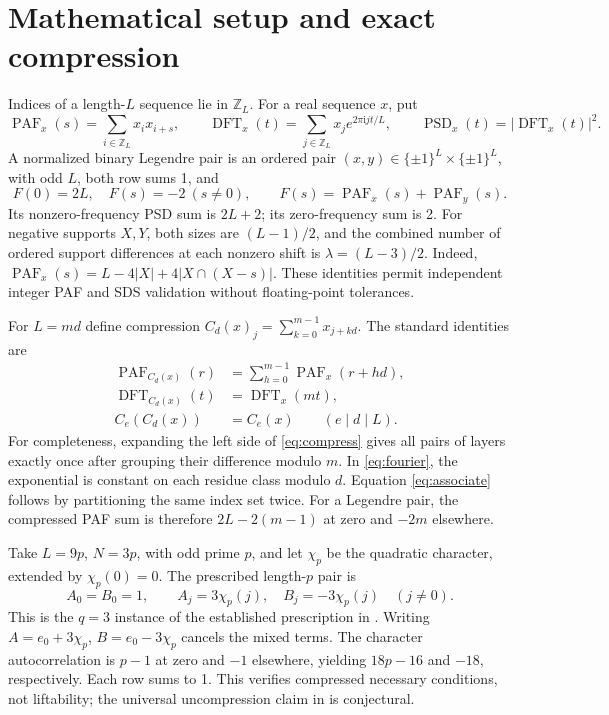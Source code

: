 \documentclass[11pt]{article}
\newcommand{\PAF}{\operatorname{PAF}}
\newcommand{\DFT}{\operatorname{DFT}}
\newcommand{\PSD}{\operatorname{PSD}}
\newcommand{\Z}{\mathbb Z}
\begin{document}
\section{Mathematical setup and exact compression}
Indices of a length-$L$ sequence lie in $\Z_L$. For a real sequence $x$, put
\[
 \PAF_x(s)=\sum_{i\in\Z_L}x_i x_{i+s},\qquad
 \DFT_x(t)=\sum_{j\in\Z_L}x_j e^{2\pi\mathrm{i}jt/L},\qquad
 \PSD_x(t)=|\DFT_x(t)|^2.
\]
A normalized binary Legendre pair is an ordered pair
$(x,y)\in\{\pm1\}^L\times\{\pm1\}^L$, with odd $L$, both row sums 1,
and
\begin{equation}\label{eq:lp}
 F(0)=2L,\quad F(s)=-2\ (s\ne0),\qquad
 F(s)=\PAF_x(s)+\PAF_y(s).
\end{equation}
Its nonzero-frequency PSD sum is $2L+2$; its zero-frequency sum is 2.
For negative supports $X,Y$, both sizes are $(L-1)/2$, and the combined
number of ordered support differences at each nonzero shift is
$\lambda=(L-3)/2$. Indeed,
$\PAF_x(s)=L-4|X|+4|X\cap(X-s)|$. These identities permit independent
integer PAF and SDS validation without floating-point tolerances.

For $L=md$ define compression $C_d(x)_j=\sum_{k=0}^{m-1}x_{j+kd}$.
The standard identities \cite{compression} are
\begin{align}
 \PAF_{C_d(x)}(r)&=\sum_{h=0}^{m-1}\PAF_x(r+hd),\label{eq:compress}\\
 \DFT_{C_d(x)}(t)&=\DFT_x(mt),\label{eq:fourier}\\
 C_e(C_d(x))&=C_e(x)\qquad(e\mid d\mid L).\label{eq:associate}
\end{align}
For completeness, expanding the left side of \eqref{eq:compress} gives
all pairs of layers exactly once after grouping their difference modulo $m$.
In \eqref{eq:fourier}, the exponential is constant on each residue class
modulo $d$. Equation \eqref{eq:associate} follows by partitioning the same
index set twice. For a Legendre pair, the compressed PAF sum is therefore
$2L-2(m-1)$ at zero and $-2m$ elsewhere.

Take $L=9p$, $N=3p$, with odd prime $p$, and let $\chi_p$ be the quadratic
character, extended by $\chi_p(0)=0$. The prescribed length-$p$ pair is
\begin{equation}\label{eq:prescribed}
 A_0=B_0=1,\qquad A_j=3\chi_p(j),\quad B_j=-3\chi_p(j)\quad(j\ne0).
\end{equation}
This is the $q=3$ instance of the established prescription in
\cite[Theorem 3.2]{issac}. Writing $A=e_0+3\chi_p$, $B=e_0-3\chi_p$
cancels the mixed terms. The character autocorrelation is $p-1$ at zero
and $-1$ elsewhere, yielding $18p-16$ and $-18$, respectively. Each row
sums to 1. This verifies compressed necessary conditions, not liftability;
the universal uncompression claim in \cite{issac} is conjectural.
\end{document}
